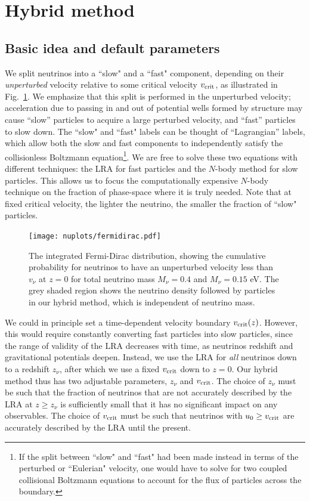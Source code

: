 \documentclass[useAMS, usenatbib]{mnras}
\begin{document}
\section{Hybrid method} \label{sec:hybrid}

\subsection{Basic idea and default parameters}

We split neutrinos into a ``slow" and a ``fast" component, depending on their \emph{unperturbed} velocity relative to some critical velocity $v_{\rm crit}$, as illustrated in Fig.~\ref{fig:fddistribution}. We emphasize that this split is performed in the unperturbed velocity; acceleration due to passing in and out of potential wells formed by structure may cause ``slow'' particles to acquire a large perturbed velocity, and ``fast'' particles to slow down. The ``slow" and ``fast" labels can be thought of ``Lagrangian'' labels, which allow both the slow and fast components to independently satisfy the collisionless Boltzmann equation\footnote{If the split between ``slow" and ``fast" had been made instead in terms of the perturbed or ``Eulerian" velocity, one would have to solve for two coupled collisional Boltzmann equations to account for the flux of particles across the boundary.}. We are free to solve these two equations with different techniques: the LRA for fast particles and the $N$-body method for slow particles. This allows us to focus the computationally expensive $N$-body technique on the fraction of phase-space where it is truly needed. Note that at fixed critical velocity, the lighter the neutrino, the smaller the fraction of ``slow" particles.

\begin{figure}
\texttt{[image: nuplots/fermidirac.pdf]}
  \caption{The integrated Fermi-Dirac distribution, showing the cumulative probability for neutrinos to have an unperturbed velocity less than $v_\nu$ at $z=0$ for total neutrino mass $M_\nu = 0.4$ and $M_\nu = 0.15$ eV.
  The grey shaded region shows the neutrino density followed by particles in our hybrid method, which is independent of neutrino mass.
  }
  \label{fig:fddistribution}
\end{figure}

We could in principle set a time-dependent velocity boundary $v_{\rm crit}(z)$. However, this would require constantly converting fast particles into slow particles, since the range of validity of the LRA decreases with time, as neutrinos redshift and gravitational potentials deepen. Instead, we use the LRA for \emph{all} neutrinos down to a redshift $z_\nu$, after which we use a fixed $v_{\rm crit}$ down to $z = 0$. Our hybrid method thus has two adjustable parameters, $z_\nu$ and $v_{\rm crit}$. The choice of $z_\nu$ must be such that the fraction of neutrinos that are not accurately described by the LRA at $z \geq z_\nu$ is sufficiently small that it has no significant impact on any observables. The choice of $v_{\rm crit}$ must be such that neutrinos with $u_0 \geq v_{\rm crit}$ are accurately described by the LRA until the present.
\end{document}
